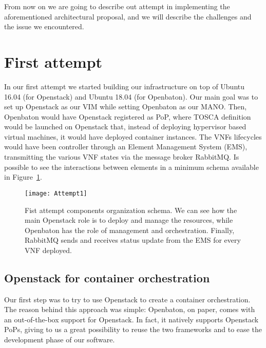 From now on we are going to describe out attempt in implementing the
aforementioned architectural proposal, and we will describe the challenges and
the issue we encountered.

\section{First attempt}

In our first attempt we started building our infrastructure on top of Ubuntu
16.04 (for Openstack) and Ubuntu 18.04 (for Openbaton). Our main goal was to set
up Openstack as our VIM while setting Openbaton as our MANO. Then, Openbaton
would have Openstack registered as PoP, where TOSCA definition would be launched
on Openstack that, instead of deploying hypervisor based virtual machines, it
would have deployed container instances. The VNFs lifecycles would have been
controller through an Element Management System (EMS), transmitting the various
VNF states via the message broker RabbitMQ. Is possible to see the interactions
between elements in a minimum schema available in
Figure~\ref{chap:archimpl:sec:fistattempt:img:schema1}.

\begin{figure}[t]
  \centering
  \texttt{[image: Attempt1]}
  \caption[Fist attempt components organization schema]{Fist attempt components
    organization schema. We can see how the main Openstack role is to deploy and
    manage the resources, while Openbaton has the role of management and
    orchestration. Finally, RabbitMQ sends and receives status update from the
    EMS for every VNF deployed.}
  \label{chap:archimpl:sec:fistattempt:img:schema1}
\end{figure}

\subsection{Openstack for container orchestration}

Our first step was to try to use Openstack to create a container orchestration. 
The reason behind this approach was simple: Openbaton, on paper, comes with an 
out-of-the-box support for Openstack. In fact, it natively supports Openstack 
PoPs, giving to us a great possibility to reuse the two frameworks and to ease 
the development phase of our software.
